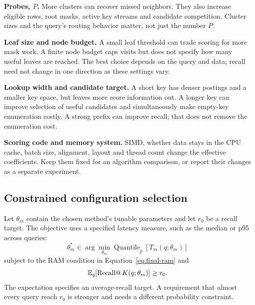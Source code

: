 \textbf{Probes, $P$.} More clusters can recover missed neighbors. They also increase eligible
rows, root masks, active key streams and candidate competition. Cluster sizes and the query's
routing behavior matter, not just the number $P$.

\textbf{Leaf size and node budget.} A small leaf threshold can trade scoring for more mask work.
A finite node budget caps visits but does not specify how many useful leaves are reached.
The best choice depends on the query and data; recall need not change in one direction as these settings vary.

\textbf{Lookup width and candidate target.} A short key has denser postings and a smaller key
space, but leaves more score information out. A longer key can improve selection of useful candidates
and simultaneously make empty-key enumeration costly. A strong prefix can improve recall;
that does not remove the enumeration cost.

\textbf{Scoring code and memory system.} SIMD, whether data stays in the CPU cache, batch size, alignment, layout and
thread count change the effective coefficients. Keep them fixed for an algorithm comparison,
or report their changes as a separate experiment.

\subsection{Constrained configuration selection}
Let $\theta_m$ contain the chosen method's tunable parameters and let $r_0$ be a recall target.
The objective uses a specified latency measure, such as the median or p95 across queries:
\begin{equation}
\theta_m^*\in\arg\min_{\theta_m}\operatorname{Quantile}_{p}[T_m(q;\theta_m)]
\end{equation}
subject to the RAM condition in Equation~\eqref{eq:final-ram} and
\begin{equation}
\mathbb E_q[\operatorname{Recall@}K(q;\theta_m)]\geq r_0.
\label{eq:optimization}
\end{equation}
The expectation specifies an average-recall target. A requirement that almost every query
reach $r_0$ is stronger and needs a different probability constraint.

